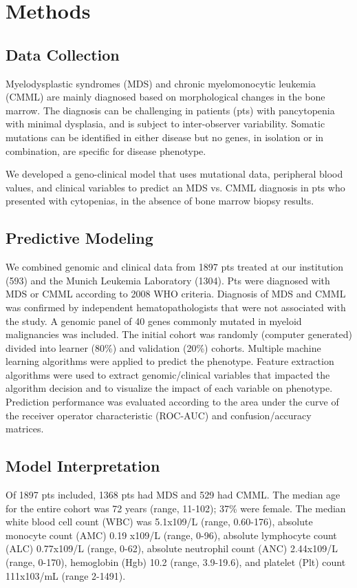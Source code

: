 \section{Methods}%
\subsection{Data Collection}%

Myelodysplastic syndromes (MDS) and chronic myelomonocytic leukemia (CMML) are mainly diagnosed based on morphological changes in the bone marrow. The diagnosis can be challenging in patients (pts) with pancytopenia with minimal dysplasia, and is subject to inter-observer variability. Somatic mutations can be identified in either disease but no genes, in isolation or in combination, are specific for disease phenotype.

We developed a geno-clinical model that uses mutational data, peripheral blood values, and clinical variables to predict an MDS vs. CMML diagnosis in pts who presented with cytopenias, in the absence of bone marrow biopsy results.


\subsection{Predictive Modeling}%

We combined genomic and clinical data from 1897 pts treated at our institution (593) and the Munich Leukemia Laboratory (1304). Pts were diagnosed with MDS or CMML according to 2008 WHO criteria. Diagnosis of MDS and CMML was confirmed by independent hematopathologists that were not associated with the study. A genomic panel of 40 genes commonly mutated in myeloid malignancies was included. The initial cohort was randomly (computer generated) divided into learner (80\%) and validation (20\%) cohorts. Multiple machine learning algorithms were applied to predict the phenotype. Feature extraction algorithms were used to extract genomic/clinical variables that impacted the algorithm decision and to visualize the impact of each variable on phenotype. Prediction performance was evaluated according to the area under the curve of the receiver operator characteristic (ROC-AUC) and confusion/accuracy matrices.


\subsection{Model Interpretation}%

Of 1897 pts included, 1368 pts had MDS and 529 had CMML. The median age for the entire cohort was 72 years (range, 11-102); 37\% were female. The median white blood cell count (WBC) was 5.1x109/L (range, 0.60-176), absolute monocyte count (AMC) 0.19 x109/L (range, 0-96), absolute lymphocyte count (ALC) 0.77x109/L (range, 0-62), absolute neutrophil count (ANC) 2.44x109/L (range, 0-170), hemoglobin (Hgb) 10.2 (range, 3.9-19.6), and platelet (Plt) count 111x103/mL (range 2-1491).

